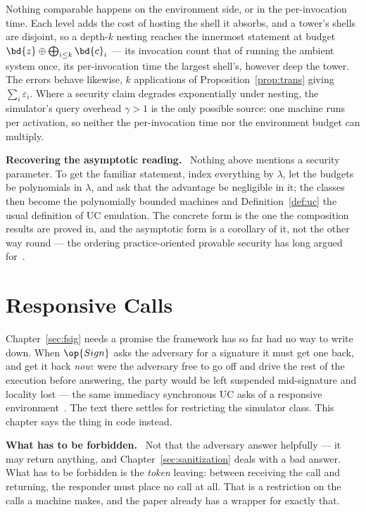 \documentclass[10pt,oneside,openany]{book}
\newcommand{\heading}[1]{\medskip\par\noindent\textcolor{accent}{\textbf{#1.}}\ }
\theoremstyle{accentdef}
\theoremstyle{accentplain}
\begin{document}
Nothing comparable happens on the environment side, or in the per-invocation time. Each level adds
the cost of hosting the shell it absorbs, and a tower's shells are disjoint, so a depth-$k$ nesting
reaches the innermost statement at budget $\bd{z} \oplus \bigoplus_{i \leq k} \bd{c}_i$ --- its
invocation count that of running the ambient system once, its per-invocation time the largest
shell's, however deep the tower. The errors behave likewise, $k$ applications of
Proposition~\ref{prop:trans} giving $\sum_i \varepsilon_i$. Where a security claim degrades
exponentially under nesting, the simulator's query overhead $\gamma > 1$ is the only possible
source: one machine runs per activation, so neither the per-invocation time nor the environment
budget can multiply.

\heading{Recovering the asymptotic reading} Nothing above mentions a security parameter. To get
the familiar statement, index everything by $\lambda$, let the budgets be polynomials in
$\lambda$, and ask that the advantage be negligible in it; the classes then become the
polynomially bounded machines and Definition~\ref{def:uc} the usual definition of UC emulation.
The concrete form is the one the composition results are proved in, and the asymptotic form is a
corollary of it, not the other way round --- the ordering practice-oriented provable security has
long argued for~\cite{Bellare97}.

\chapter{Responsive Calls}\label{app:responsive}

Chapter~\ref{sec:fsig} needs a promise the framework has so far had no way to write down. When
$\op{Sign}$ asks the adversary for a signature it must get one back, and get it back \emph{now}:
were the adversary free to go off and drive the rest of the execution before answering, the party
would be left suspended mid-signature and locality lost --- the same immediacy synchronous UC asks
of a responsive environment~\cite{KMTZ13}. The text there settles for restricting
the simulator class. This chapter says the thing in code instead.

\heading{What has to be forbidden} Not that the adversary answer helpfully --- it may return
anything, and Chapter~\ref{sec:sanitization} deals with a bad answer. What has to be forbidden is
the \emph{token} leaving: between receiving the call and returning, the responder must place no
call at all. That is a restriction on the calls a machine makes, and the paper already has a
wrapper for exactly that.
\end{document}
